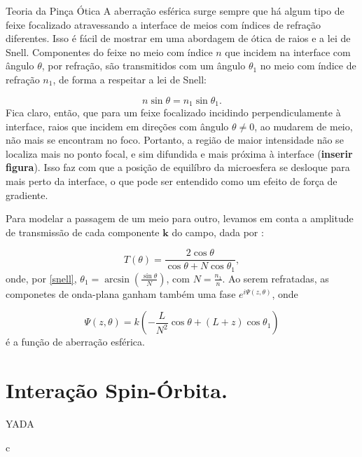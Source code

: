\begin{chapter}{Teoria da Pinça Ótica}
\hspace{5 mm}A aberração esférica surge sempre que há algum tipo de feixe focalizado atravessando a interface de meios com índices de refração diferentes. Isso é fácil de mostrar em uma abordagem de ótica de raios e a lei de Snell. Componentes do feixe no meio com índice $n$ que incidem na interface com ângulo $\theta$, por refração, são transmitidos com um ângulo $\theta_1$ no meio com índice de refração $n_1$, de forma a respeitar a lei de Snell:

\begin{equation}
n\sin\theta=n_1\sin\theta_1.
\label{snell}
\end{equation}
%
Fica claro, então, que para um feixe focalizado incidindo perpendiculamente à interface, raios que incidem em direções com ângulo $\theta\ne 0$, ao mudarem de meio, não mais se encontram no foco. Portanto, a região de maior intensidade não se localiza mais no ponto focal, e sim difundida e mais próxima à interface ({\bf inserir figura}). Isso faz com que a posição de equilíbro da microesfera se desloque para mais perto da interface, o que pode ser entendido como um efeito de força de gradiente.

Para modelar a passagem de um meio para outro, levamos em conta a amplitude de transmissão de cada componente ${\mathbf k}$ do campo, dada por \cite{Viana2007}:

\begin{equation}
T(\theta)=\frac{2\cos\theta}{\cos\theta + N\cos\theta_1} ,
\label{transmitancia}
\end{equation}
%
onde, por \ref{snell}, $\theta_1=\arcsin(\frac{\sin\theta}{N})$, com $N=\frac{n_1}{n}$. Ao serem refratadas, as componetes de onda-plana ganham também uma fase $e^{i\Psi(z, \theta)}$, onde

\begin{equation}
\Psi(z,\theta)=k\left( -\frac{L}{N^2}\cos\theta +(L+z)\cos\theta_1 \right)
\label{faseSA}
\end{equation}
%
é a função de aberração esférica.


\section{Interação Spin-Órbita.}

YADA

\end{chapter}
c
